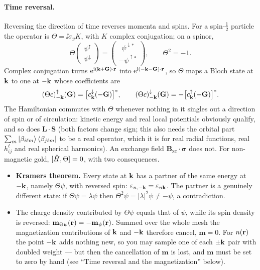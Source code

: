 \paragraph{Time reversal.} Reversing the direction of time reverses
momenta and spins. For a spin-$\tfrac12$ particle the operator is
$\Theta = \ii \sigma_y K$, with $K$ complex conjugation; on a spinor,
\begin{equation}
\Theta \begin{pmatrix}\psi^{\uparrow}\\ \psi^{\downarrow}\end{pmatrix}
= \begin{pmatrix}\ \ \psi^{\downarrow *}\\ -\psi^{\uparrow *}\end{pmatrix},
\qquad \Theta^2 = -1 .
\end{equation}
Complex conjugation turns $\mathrm{e}^{\mathrm{i}(\mathbf{k}+\mathbf{G})\cdot\mathbf{r}}$ into
$\mathrm{e}^{\mathrm{i}(-\mathbf{k}-\mathbf{G})\cdot\mathbf{r}}$, so $\Theta$ maps a Bloch state at $\mathbf{k}$ to
one at $-\mathbf{k}$ whose coefficients are
\begin{equation}
(\Theta c)^{\uparrow}_{-\mathbf{k}}(\mathbf{G}) = \big[c^{\downarrow}_{\mathbf{k}}(-\mathbf{G})\big]^*,
\qquad
(\Theta c)^{\downarrow}_{-\mathbf{k}}(\mathbf{G}) = -\big[c^{\uparrow}_{\mathbf{k}}(-\mathbf{G})\big]^* .
\label{eq:trcoeff}
\end{equation}
The Hamiltonian commutes with $\Theta$ whenever nothing in it singles out a
direction of spin or of circulation: kinetic energy and real local
potentials obviously qualify, and so does $\mathbf L\cdot\mathbf S$ (both
factors change sign; this also needs the orbital part
$\sum_m\ket{\beta_{i\ell m}}\bra{\beta_{j\ell m}}$ to be a real operator,
which it is for real radial functions, real $h^\ell_{ij}$ and real
spherical harmonics). An exchange field $\mathbf B_{\mathrm{xc}}\cdot\bm\sigma$
does not. For non-magnetic gold, $[\hat{H},\Theta]=0$, with two consequences.
\begin{itemize}[leftmargin=2em]
\item \textbf{Kramers theorem.} Every state at $\mathbf{k}$ has a partner of the
same energy at $-\mathbf{k}$, namely $\Theta\psi$, with reversed spin:
$\varepsilon_{n,-\mathbf{k}} = \varepsilon_{n\mathbf{k}}$. The partner is a genuinely
different state: if $\Theta\psi = \lambda\psi$ then
$\Theta^2\psi = |\lambda|^2\psi \ne -\psi$, a contradiction.
\item The charge density contributed by $\Theta\psi$ equals that of
$\psi$, while its spin density is reversed:
$\mathbf m_{\Theta\psi}(\mathbf{r}) = -\mathbf m_{\psi}(\mathbf{r})$. Summed over the
whole mesh the magnetization contributions of $\mathbf{k}$ and $-\mathbf{k}$ therefore
cancel, $\mathbf m = 0$. For $n(\mathbf{r})$ the point $-\mathbf{k}$ adds nothing new,
so you may sample one of each $\pm\mathbf{k}$ pair with doubled weight --- but
then the cancellation of $\mathbf m$ is lost, and $\mathbf m$ must be set
to zero by hand (see ``Time reversal and the magnetization'' below).
\end{itemize}
